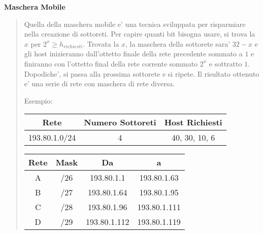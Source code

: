 \documentclass{article}
\begin{document}
{    \textbf{Maschera Mobile}
    \begin{quote}
      Quella della maschera mobile e' una tecnica sviluppata per risparmiare nella creazione di sottoreti. Per capire quanti bit bisogna usare, si trova la $ x $ per $ 2^x \geqslant h_{richiesti} $. Trovata la $ x $, la maschera della sottorete sara' $ 32 - x $ e gli host inizieranno dall'ottetto finale della rete precedente sommato a $ 1 $ e finiranno con l'ottetto final della rete corrente sommato $ 2^x $ e sottratto $ 1 $. Dopodiche', si passa alla prossima sottorete e si ripete. Il risultato ottenuto e' una serie di rete con maschera di rete diversa.

      Esempio:

      \begin{tabular}{ |c|c|c| }
        \hline
        Rete & Numero Sottoreti & Host Richiesti \\
        \hline
        193.80.1.0/24 & 4 & 40, 30, 10, 6 \\
        \hline
      \end{tabular}

      \begin{tabular}{ |c|c|c|c| }
        \hline
        Rete & Mask & Da & a \\
        \hline
        A & /26 & 193.80.1.1 & 193.80.1.63 \\
        B & /27 & 193.80.1.64 & 193.80.1.95 \\
        C & /28 & 193.80.1.96 & 193.80.1.111 \\
        D & /29 & 193.80.1.112 & 193.80.1.119 \\
        \hline
      \end{tabular}
    \end{quote}
  }
\end{document}
